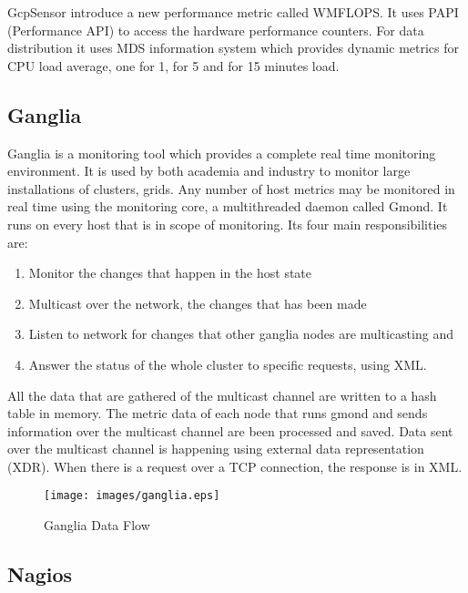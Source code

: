 GcpSensor \cite{gcpsensor} introduce a new performance metric called WMFLOPS. It uses PAPI \cite{papi} (Performance API) to access the hardware performance counters. For data distribution it uses MDS information system which provides dynamic metrics for CPU load average, one for 1, for 5 and for 15 minutes load.

\subsection{Ganglia}

Ganglia is a monitoring tool which provides a complete real time monitoring environment. It is used by both academia and industry to monitor large installations of clusters, grids. Any number of host metrics may be monitored in real time using the monitoring core, a multithreaded daemon called Gmond. It runs on every host that is in scope of monitoring. Its four main responsibilities are:

\begin{enumerate}
\item Monitor the changes that happen in the host state
\item Multicast over the network, the changes that has been made
\item Listen to network for changes that other ganglia nodes are multicasting and
\item Answer the status of the whole cluster to specific requests, using XML.
\end{enumerate}

All the data that are gathered of the multicast channel are written to a hash table in memory. The metric data of each node that runs gmond and sends information over the multicast channel are been processed and saved. Data sent over the multicast channel is happening using external data representation (XDR). When there is a request over a TCP connection, the response is in XML.


\begin{figure}[ht]
\centering
 \texttt{[image: images/ganglia.eps]}
\caption{Ganglia Data Flow}
\label{figure:ganglia}
\end{figure}

\subsection{Nagios}

